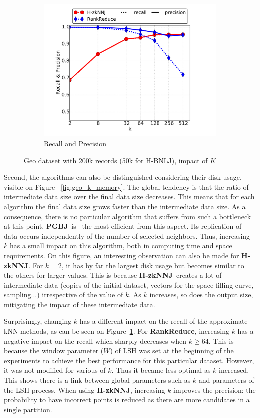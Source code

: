 \documentclass[10pt,journal,compsoc]{IEEEtran}
\newcommand{\Z}{{\bf H-zkNNJ}}
\newcommand{\LSH}{{\bf RankReduce}}
\newcommand{\VO}{{\bf PGBJ}}
\begin{document}
\begin{figure}[htp]
\begin{subfigure}[b]{0.35\textwidth}
		\includegraphics[width=\textwidth]{img-perf/geo/k/accuracy.pdf} 
		\caption{Recall and Precision \label{fig:geo_k_acc}}            
	\end{subfigure}%
	\caption{ Geo dataset with 200k records (50k for H-BNLJ), impact of $K$  }
	\label{fig:geo_impact_k}
\end{figure}

Second, the algorithms can also be distinguished considering their disk usage, visible on 
Figure ~\ref{fig:geo_k_memory}. The global tendency is that the ratio of intermediate data size over the final data 
size decreases. This means that for each algorithm the final 
data size grows faster than the intermediate data size. As a consequence, there is no particular algorithm that 
suffers from such a bottleneck at this point.
\VO~is \ the most efficient from this aspect. Its replication of data occurs independently of the number of 
selected neighbors. Thus, increasing $k$ has a small impact on this algorithm, both in computing time and space 
requirements. On this figure, an interesting observation can also be made for \Z. For $k=2$, it has by far the 
largest disk
usage but becomes similar to the others for larger values. 
This is because \Z~creates a lot of intermediate data (copies of the initial dataset, vectors for the space 
filling curve, sampling...) irrespective of the value of $k$. As $k$ increases, so does the output size, mitigating the 
impact of these intermediate data. 

Surprisingly, changing $k$ has a different impact on the recall of the approximate kNN methods, as can be seen on 
Figure~\ref{fig:geo_k_acc}.
For \LSH, increasing $k$ has a negative impact on the recall which sharply decreases when $k\geq 64$. This is
because the window parameter ($W$) of LSH was set at the beginning of the experiments to achieve the best performance for this
particular dataset. However, it was not modified for various of $k$. Thus it became less optimal as $k$ increased. This 
shows there is a link between global parameters such 
as $k$ and parameters of the LSH process. When using \Z, 
increasing $k$  improves the precision: the probability to have incorrect points is reduced as there are more 
candidates in a single partition. 
\end{document}
